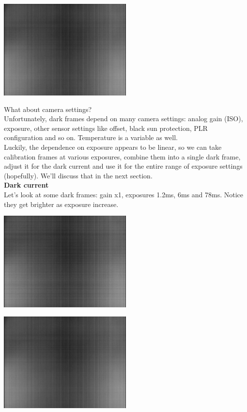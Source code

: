 \begin{center}
\includegraphics[height=5cm]{images/darkavg-5ms}
\end{center}

What about camera settings?\\

Unfortunately, dark frames depend on many camera settings: analog gain (ISO), exposure, other sensor settings like offset, black sun protection, PLR configuration and so on. Temperature is a variable as well.\\

Luckily, the dependence on exposure appears to be linear, so we can take calibration frames at various exposures, combine them into a single dark frame, adjust it for the dark current and use it for the entire range of exposure settings (hopefully). We'll discuss that in the next section.\\ 

\textbf{Dark current}\\

Let's look at some dark frames: gain x1, exposures 1.2ms, 6ms and 78ms. Notice they get brighter as exposure increase.\\

\begin{center}
\includegraphics[height=5cm]{images/blackframes-gainx1-offset2047-1ms-01}
\end{center}

\begin{center}
\includegraphics[height=5cm]{images/darkavg-5ms}
\end{center} 

